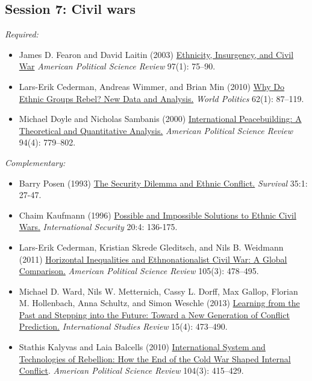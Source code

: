 \documentclass[12pt, a4paper]{article}
\begin{document}
\subsection*{Session 7: Civil wars}

\noindent\textit{Required:}

\begin{itemize}
  \item James D. Fearon and David Laitin (2003) \href{https://doi.org/10.1017/S0003055403000534}{Ethnicity, Insurgency, and Civil War} \textit{American Political Science Review} 97(1): 75--90.
  \item Lars-Erik Cederman, Andreas Wimmer, and Brian Min (2010) \href{https://doi.org/10.1017/S0043887109990219}{Why Do Ethnic Groups Rebel? New Data and Analysis.} \textit{World Politics} 62(1): 87--119.
  \item Michael Doyle and Nicholas Sambanis (2000) \href{https://doi.org/10.2307/2586208}{International Peacebuilding: A Theoretical and Quantitative Analysis.} \textit{American Political Science Review} 94(4): 779--802.
\end{itemize}

\noindent\textit{Complementary:}

\begin{itemize}
  \item Barry Posen (1993) \href{https://doi.org/10.1080/00396339308442672}{The Security Dilemma and Ethnic Conflict.} \textit{Survival} 35:1: 27-47.
  \item Chaim Kaufmann (1996) \href{https://doi.org/10.1162/isec.20.4.136}{Possible and Impossible Solutions to Ethnic Civil Wars.} \textit{International Security} 20:4: 136-175.
  \item Lars-Erik Cederman, Kristian Skrede Gleditsch, and Nils B. Weidmann (2011) \href{https://doi.org/10.1017/S0003055411000207}{Horizontal Inequalities and Ethnonationalist Civil War: A Global Comparison.} \textit{American Political Science Review} 105(3): 478--495.
  \item Michael D. Ward, Nils W. Metternich, Cassy L. Dorff, Max Gallop, Florian M. Hollenbach, Anna Schultz, and Simon Weschle (2013) \href{https://doi.org/10.1111/misr.12072}{Learning from the Past and Stepping into the Future: Toward a New Generation of Conflict Prediction.} \textit{International Studies Review} 15(4): 473--490.
  \item Stathis Kalyvas and Laia Balcells (2010) \href{https://doi.org/10.1017/S0003055410000286}{International System and Technologies of Rebellion: How the End of the Cold War Shaped Internal Conflict}. \textit{American Political Science Review} 104(3): 415--429.
\end{itemize}
\end{document}
